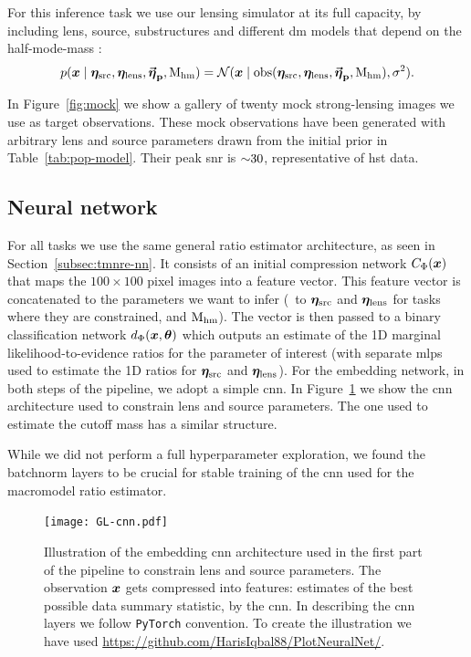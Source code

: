For this inference task we use our lensing simulator at its full capacity, by including lens, source, substructures and different \gls*{dm} models that depend on the half-mode-mass \mhm:
\begin{equation}
    p(\bm{x}\mid\bm{\eta}_\mathrm{src}, \bm{\eta}_\mathrm{lens},\boldsymbol{\vec{{\bm{\eta}}}_\mathrm{p}}, \mathrm{M_{hm}})
    = \mathcal{N}(\bm{x}\mid\mathrm{obs}(\bm{\eta}_\mathrm{src}, \bm{\eta}_\mathrm{lens}, \boldsymbol{\vec{{\bm{\eta}}}_\mathrm{p}}, \mathrm{M_{hm}}), \sigma^2).
\end{equation}

In Figure~\ref{fig:mock} we show a gallery of twenty mock strong-lensing images we use as target observations. These mock observations have been generated with arbitrary lens and source parameters drawn from the initial prior in Table~\ref{tab:pop-model}. Their peak \gls*{snr} is $\num{\sim 30}$, representative of \gls*{hst} data.


\subsection{Neural network}
\label{subsec:pop-nn}

For all tasks we use the same general ratio estimator architecture, as seen in Section~\ref{subsec:tmnre-nn}. It consists of an initial compression network $C_\Phi(\bm{x})$ that maps the $100 \times 100$ pixel images into a feature vector. This feature vector is concatenated to the parameters we want to infer (\eg~to $\bm{\eta}_\mathrm{src}$ and $\bm{\eta}_\mathrm{lens}$ for tasks where they are constrained, and $\mathrm{M_{hm}}$). The vector is then passed to a binary classification network $d_\Phi(\bm{x}, \bm{\theta})$ which outputs an estimate of the 1D marginal likelihood-to-evidence ratios for the parameter of interest (with separate \gls*{mlp}s used to estimate the 1D ratios for $\bm{\eta}_\mathrm{src}$ and $\bm{\eta}_\mathrm{lens}$). For the embedding network, in both steps of the pipeline, we adopt a simple \gls*{cnn}. In Figure~\ref{fig:cnn} we show the \gls*{cnn} architecture used to constrain lens and source parameters. The one used to estimate the cutoff mass has a similar structure.

While we did not perform a full hyperparameter exploration, we found the batchnorm layers to be crucial for stable training of the \gls*{cnn} used for the macromodel ratio estimator.

\begin{figure}
	\centering
	\texttt{[image: GL-cnn.pdf]}
	\caption{Illustration of the embedding \gls*{cnn} architecture used in the first part of the pipeline to constrain lens and source parameters. The observation $\bm{x}$ gets compressed into features: estimates of the best possible data summary statistic, by the \gls*{cnn}. In describing the \gls*{cnn} layers we follow \texttt{PyTorch} \cite{pytorch} convention. To create the illustration we have used \url{https://github.com/HarisIqbal88/PlotNeuralNet/}.}
\label{fig:cnn}
\end{figure}


